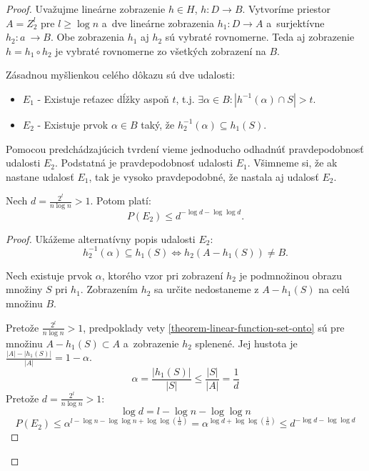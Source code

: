 \begin{proof}
Uvažujme lineárne zobrazenie $h \in H$, $h: D \rightarrow B$. Vytvoríme priestor $A = Z_2^l$ pre $l \geq \log n$ a~dve lineárne zobrazenia $h_1: D \rightarrow A$ a~surjektívne $h_2: a~\rightarrow B$. Obe zobrazenia $h_1$ aj $h_2$ sú vybraté rovnomerne. Teda aj zobrazenie $h = h_1 \circ h_2$ je vybraté rovnomerne zo všetkých zobrazení na $B$.

Zásadnou myšlienkou celého dôkazu sú dve udalosti:
\begin{itemize}
\item $E_1$ - Existuje reťazec dĺžky aspoň $t$, t.j. $\exists \alpha \in B: | h^{-1}(\alpha) \cap S | > t$.
\item $E_2$ - Existuje prvok $\alpha \in B$ taký, že $h_2^{-1}(\alpha) \subseteq h_1(S)$.
\end{itemize}
Pomocou predchádzajúcich tvrdení vieme jednoducho odhadnúť pravdepodobnosť udalosti $E_2$. Podstatná je pravdepodobnosť udalosti $E_1$. Všimneme si, že ak nastane udalosť $E_1$, tak je vysoko pravdepodobné, že nastala aj udalosť $E_2$.

\begin{remark}
\label{remark-e2-probability}
Nech $d = \frac{2^l}{n \log n} > 1$. Potom platí:
\begin{displaymath}
P(E_2) \leq d^{-\log d - \log \log d}\textit{.}
\end{displaymath}
\end{remark}
\begin{proof}
Ukážeme alternatívny popis udalosti $E_2$:
\begin{displaymath}
h_2^{-1}(\alpha) \subseteq h_1(S) \Leftrightarrow h_2(A - h_1(S)) \neq B \textit{.}
\end{displaymath}

Nech existuje prvok $\alpha$, ktorého vzor pri zobrazení $h_2$ je podmnožinou obrazu množiny $S$ pri $h_1$. Zobrazením $h_2$ sa určite nedostaneme z $A - h_1(S)$ na celú množinu $B$.

Pretože $\frac{2^l}{n \log n} > 1$, predpoklady vety \ref{theorem-linear-function-set-onto} sú pre množinu $A - h_1(S) \subset A$ a~zobrazenie $h_2$ splenené.
Jej hustota je $\frac{|A| - |h_1(S)|}{|A|} = 1 - \alpha$.
\begin{displaymath}
\alpha = \frac{|h_1(S)|}{|S|} \leq \frac{|S|}{|A|} = \frac{1}{d}
\end{displaymath}
Pretože $d = \frac{2^l}{n \log n} > 1$:
\begin{displaymath}
\log d = l - \log n - \log \log n
\end{displaymath}
\begin{displaymath}
P(E_2) \leq \alpha^{l - \log n - \log \log n + \log \log \left(\frac{1}{\alpha}\right)} = \alpha ^ {\log d + \log \log \left(\frac{1}{\alpha}\right)} \leq d^{-\log d - \log \log d}
\end{displaymath}
\end{proof}


\end{proof}
